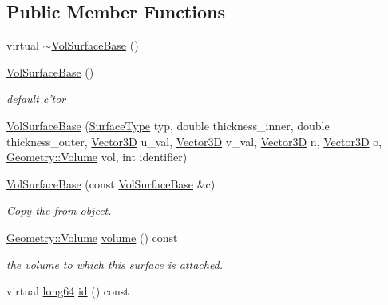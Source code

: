 \subsection*{Public Member Functions}
\begin{DoxyCompactItemize}
\item 
virtual \hyperlink{class_d_d4hep_1_1_d_d_rec_1_1_vol_surface_base_a675e603aff05bfb6f75fac1929f2b8df}{$\sim$VolSurfaceBase} ()
\item 
\hyperlink{class_d_d4hep_1_1_d_d_rec_1_1_vol_surface_base_a837e93db1de913c7a7fccee261a59dd7}{VolSurfaceBase} ()
\begin{DoxyCompactList}\small\item\em default c'tor \item\end{DoxyCompactList}\item 
\hyperlink{class_d_d4hep_1_1_d_d_rec_1_1_vol_surface_base_a2237eee6e8b307480cfd1d1ff91b534a}{VolSurfaceBase} (\hyperlink{class_d_d_surfaces_1_1_surface_type}{SurfaceType} typ, double thickness\_\-inner, double thickness\_\-outer, \hyperlink{class_d_d_surfaces_1_1_vector3_d}{Vector3D} u\_\-val, \hyperlink{class_d_d_surfaces_1_1_vector3_d}{Vector3D} v\_\-val, \hyperlink{class_d_d_surfaces_1_1_vector3_d}{Vector3D} n, \hyperlink{class_d_d_surfaces_1_1_vector3_d}{Vector3D} o, \hyperlink{class_d_d4hep_1_1_geometry_1_1_volume}{Geometry::Volume} vol, int identifier)
\item 
\hyperlink{class_d_d4hep_1_1_d_d_rec_1_1_vol_surface_base_ab23e50535b626ef54a322d4e85744c71}{VolSurfaceBase} (const \hyperlink{class_d_d4hep_1_1_d_d_rec_1_1_vol_surface_base}{VolSurfaceBase} \&c)
\begin{DoxyCompactList}\small\item\em Copy the from object. \item\end{DoxyCompactList}\item 
\hyperlink{class_d_d4hep_1_1_geometry_1_1_volume}{Geometry::Volume} \hyperlink{class_d_d4hep_1_1_d_d_rec_1_1_vol_surface_base_ad07cf1518f472a2b5b99d28f7f60b889}{volume} () const 
\begin{DoxyCompactList}\small\item\em the volume to which this surface is attached. \item\end{DoxyCompactList}\item 
virtual \hyperlink{namespace_d_d4hep_ac2a70e722b33dc7ddaa20db8954ac836}{long64} \hyperlink{class_d_d4hep_1_1_d_d_rec_1_1_vol_surface_base_ab6e54400eb78cdb78e8f4c53063f863b}{id} () const 

\end{DoxyCompactItemize}
